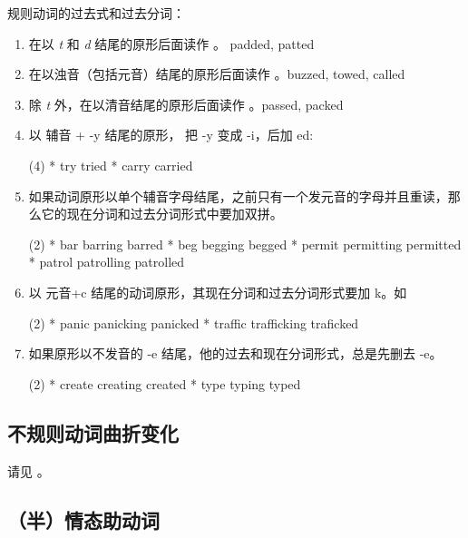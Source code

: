 规则动词的过去式和过去分词：
\begin{enumerate}
\item 在以 \emph{t} 和 \emph{d} 结尾的原形后面读作 。 padded, patted
\item 在以浊音（包括元音）结尾的原形后面读作 。buzzed, towed, called
\item 除 \emph{t} 外，在以清音结尾的原形后面读作 。passed, packed
\item 以 辅音 + -y 结尾的原形， 把 -y 变成 -i，后加 ed:
  \begin{taskitem}(4)
    * try \Rightarrow tried
    * carry  \Rightarrow carried
  \end{taskitem}

\item 如果动词原形以单个辅音字母结尾，之前只有一个发元音的字母并且重读，那么它的现在分词和过去分词形式中要加双拼。
  \begin{taskitem}(2)
    * bar \Rightarrow barring \Rightarrow barred
    * beg \Rightarrow begging \Rightarrow begged
    * permit \Rightarrow permitting \Rightarrow permitted
    * patrol \Rightarrow patrolling \Rightarrow patrolled
  \end{taskitem}

\item 以 元音+c 结尾的动词原形，其现在分词和过去分词形式要加 k。如
  \begin{taskitem}(2)
    * panic \Rightarrow panicking \Rightarrow panicked
    * traffic \Rightarrow trafficking \Rightarrow traficked
  \end{taskitem}

\item 如果原形以不发音的 -e 结尾，他的过去和现在分词形式，总是先删去 -e。
  \begin{taskitem}(2)
    * create \Rightarrow creating \Rightarrow created
    * type \Rightarrow typing \Rightarrow typed
  \end{taskitem}
\end{enumerate}

\subsection{不规则动词曲折变化}

请见 。

\subsection{（半）情态助动词}

